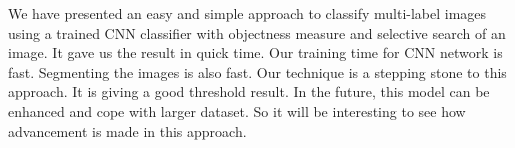 We have presented an easy and simple approach to classify multi-label images using a trained CNN classifier with objectness measure and selective search of an image. It gave us the result in quick time. Our training time for CNN network is fast. Segmenting the images is also fast. Our technique is a stepping stone to this approach. It is giving a good threshold result. In the future, this model can be enhanced and cope with larger dataset. So it will be interesting to see how advancement is made in this approach.